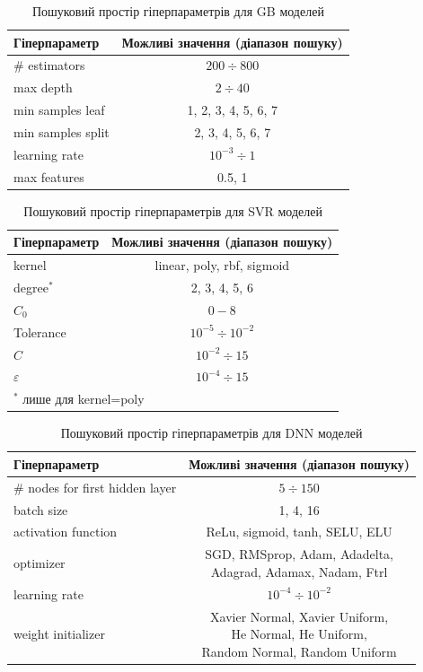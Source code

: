 \documentclass[10pt,a5paper,titlepage,oneside]{book}
\numberwithin{equation}{part}
\begin{document}
\begin{table}[!ht]
\caption{Пошуковий простір гіперпараметрів для GB моделей }
\label{tblGBs}
\centering
\begin{tabular}{|l|c|}
\hline
Гіперпараметр&Можливі значення (діапазон пошуку)\\
\hline
\# estimators&	$200\div800$\\
\hline
max depth&	$2\div40$\\
\hline
min samples leaf &	1, 2, 3, 4, 5, 6, 7\\
\hline
min samples split	&2, 3, 4, 5, 6, 7\\
\hline
learning rate	& $10^{-3}\div1$ \\
\hline
max features &	0.5, 1\\
\hline
\end{tabular}
\end{table}

\begin{table}[!ht]
\caption{Пошуковий простір гіперпараметрів для SVR моделей }
\label{tblSVRs}
\centering
\begin{tabular}{|l|c|}
\hline
Гіперпараметр&Можливі значення (діапазон пошуку)\\
\hline
kernel &	linear, poly, rbf, sigmoid\\
\hline
degree$^*$&	2, 3, 4, 5, 6\\
\hline
$C_0$ &	$0-8$\\
\hline
Tolerance	&$10^{-5}\div10^{-2}$\\
\hline
$C$	& $10^{-2}\div15$ \\
\hline
$\varepsilon$ &	$10^{-4}\div15$\\
\hline
\multicolumn{2}{l}{$^*$ лише для kernel=poly}\\
\end{tabular}
\end{table}

\begin{table}[!ht]
\caption{Пошуковий простір гіперпараметрів для DNN моделей }
\label{tblDNNs}
\centering
\begin{tabular}{|l|c|}
\hline
Гіперпараметр&Можливі значення (діапазон пошуку)\\
\hline
\# nodes for first hidden layer &$5\div150$\\
\hline
batch size&	1, 4, 16\\
\hline
activation function &	ReLu, sigmoid, tanh, SELU, ELU\\
\hline
optimizer	&\makecell{SGD, RMSprop, Adam, Adadelta, \\Adagrad, Adamax, Nadam, Ftrl}\\
\hline
learning rate	& $10^{-4}\div10^{-2}$ \\
\hline
weight initializer &	\makecell{Xavier Normal, Xavier Uniform, \\He Normal, He Uniform, \\Random Normal, Random Uniform}\\
\hline
\end{tabular}
\end{table}
\end{document}
